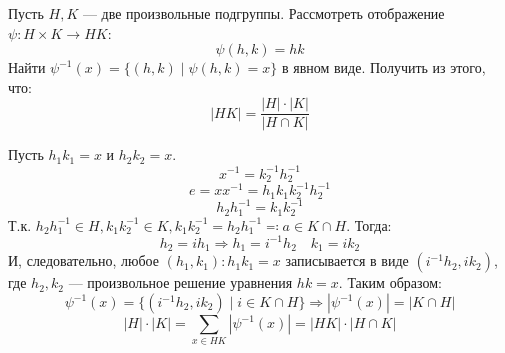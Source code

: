 \begin{exercise}
    Пусть \(H, K\) --- две произвольные подгруппы. Рассмотреть отображение \(\psi : H \times K \to HK\):
    \[\psi(h, k) = hk\]
    Найти \(\psi^{-1}(x) = \{(h, k) \mid \psi(h, k) = x\}\) в явном виде. Получить из этого, что:
    \[|HK| = \frac{|H| \cdot |K|}{|H \cap K|}\]
\end{exercise}
\begin{solution}
    Пусть \(h_1k_1 = x\) и \(h_2k_2 = x\).
    \[x^{-1} = k_2^{-1}h_2^{-1}\]
    \[e = x x^{-1} = h_1k_1k_2^{-1}h_2^{-1}\]
    \[h_2h_1^{-1} = k_1k_2^{-1}\]
    Т.к. \(h_2h_1^{-1} \in H, k_1k_2^{-1} \in K, k_1k_2^{-1} = h_2h_1^{-1} \eqqcolon a \in K \cap H\). Тогда:
    \[h_2 = ih_1 \Rightarrow h_1 = i^{-1}h_2 \quad k_1 = ik_2\]
    И, следовательно, любое \((h_1, k_1) : h_1k_1 = x\) записывается в виде \((i^{-1}h_2, ik_2)\), где \(h_2, k_2\) --- произвольное решение уравнения \(hk = x\). Таким образом:
    \[\psi^{-1}(x) = \{(i^{-1}h_2 , ik_2) \mid i \in K \cap H\} \Rightarrow |\psi^{-1}(x)|= |K \cap H|\]
    \[|H| \cdot |K| = \sum_{x \in HK} |\psi^{-1}(x)| = |HK| \cdot |H \cap K|\]
\end{solution}

